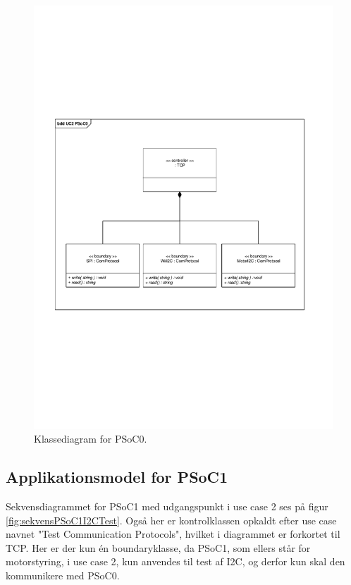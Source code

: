 \begin{figure}[H]
	\centering
	\includegraphics[width=\textwidth]{Systemarkitektur/images/klassediagramPSoC0}
	\caption{Klassediagram for PSoC0.}
	\label{fig:klassePSoC0}
\end{figure}


\subsection{Applikationsmodel for PSoC1}
Sekvensdiagrammet for PSoC1 med udgangspunkt i use case 2 ses på figur \ref{fig:sekvensPSoC1I2CTest}. Også her er kontrolklassen opkaldt efter use case navnet "Test Communication Protocols", hvilket i diagrammet er forkortet til TCP. Her er der kun én boundaryklasse, da PSoC1, som ellers står for motorstyring, i use case 2, kun anvendes til test af I2C, og derfor kun skal den kommunikere med PSoC0. 

